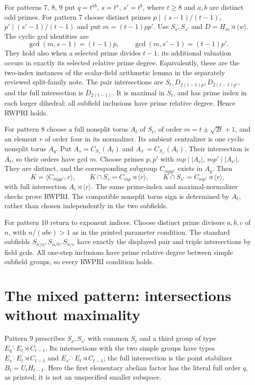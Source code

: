 \documentclass[11pt,a4paper]{article}
\newcommand{\gen}[1]{\langle#1\rangle}
\begin{document}
For patterns 7, 8, 9 put $q=t^{ab}$, $s=t^a$, $s'=t^b$, where
$t\ge8$ and $a,b$ are distinct odd primes. For pattern 7 choose distinct
primes $p\mid(s-1)/(t-1)$, $p'\mid(s'-1)/(t-1)$ and put
$m=(t-1)pp'$. Use $S_s,S_{s'}$ and $D=H_m\rtimes\gen w$.
The cyclic gcd identities are
\[
 \gcd(m,s-1)=(t-1)p,\qquad
 \gcd(m,s'-1)=(t-1)p'.
\]
They hold also when a selected prime divides $t-1$: its additional
valuation occurs in exactly its selected relative prime degree.
Equivalently, these are the two-index instances of the scalar-field
arithmetic lemma in the separately reviewed split-family note.
The pair intersections are $S_t,D_{2(t-1)p},D_{2(t-1)p'}$, and the
full intersection is $D_{2(t-1)}$. It is maximal in $S_t$, and has
prime index in each larger dihedral; all subfield inclusions have
prime relative degree. Hence RWPRI holds.

For pattern 8 choose a full nonsplit torus $A_t$ of $S_t$, of order
$m=t\pm\sqrt{2t}+1$, and an element $r$ of order four in its
normalizer. Its ambient centralizer is one cyclic nonsplit torus $A_q$.
Put $A_s=C_{S_s}(A_t)$ and $A_{s'}=C_{S_{s'}}(A_t)$.
Their intersection is $A_t$, so their orders have gcd $m$.
Choose primes $p,p'$ with $mp\mid|A_s|$, $mp'\mid|A_{s'}|$.
They are distinct, and the corresponding subgroup $C_{mpp'}$ exists
in $A_q$. Then
\[
 K=\gen{C_{mpp'},r},\qquad
 K\cap S_s=C_{mp}\rtimes\gen r,\qquad
 K\cap S_{s'}=C_{mp'}\rtimes\gen r,
\]
with full intersection $A_t\rtimes\gen r$. The same prime-index
and maximal-normalizer checks prove RWPRI. The compatible nonsplit
torus sign is determined by $A_t$, rather than chosen independently
in the two subfields.

For pattern 10 return to exponent indices. Choose distinct prime
divisors $a,b,c$ of $n$, with $n/(abc)>1$ as in the printed parameter
condition. The standard subfields
$S_{n/a},S_{n/b},S_{n/c}$ have exactly the displayed pair and triple
intersections by field gcds. All one-step inclusions have prime
relative degree between simple subfield groups, so every RWPRI
condition holds.

\section{The mixed pattern: intersections without maximality}
Pattern 9 prescribes $S_s,S_{s'}$ with common $S_t$ and a third group
of type $E_q\mathbin{\hat\cdot}E_t\rtimes C_{t-1}$.
Its intersections with the two simple groups have types
$E_s\mathbin{\hat\cdot}E_t\rtimes C_{t-1}$ and
$E_{s'}\mathbin{\hat\cdot}E_t\rtimes C_{t-1}$; the full
intersection is the point stabilizer $B_t=U_tH_{t-1}$.
Here the first elementary abelian factor has the literal full order
$q$, as printed; it is not an unspecified smaller subspace.
\end{document}
